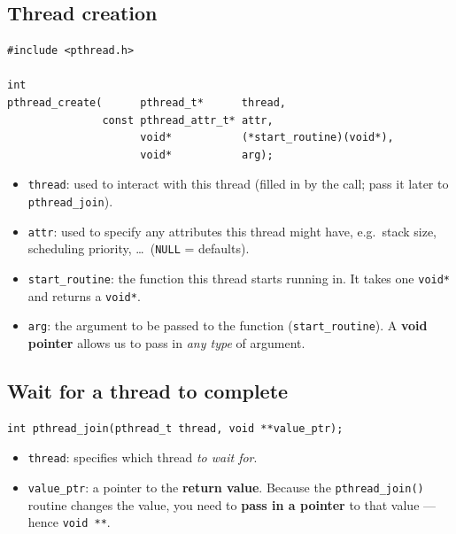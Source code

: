 \documentclass[11pt,a4paper]{article}
\begin{document}
\subsection{Thread creation}

\begin{lstlisting}[numbers=none]
#include <pthread.h>

int
pthread_create(      pthread_t*      thread,
               const pthread_attr_t* attr,
                     void*           (*start_routine)(void*),
                     void*           arg);
\end{lstlisting}

\begin{itemize}
  \item \texttt{thread}: used to interact with this thread (filled in by
        the call; pass it later to \texttt{pthread\_join}).
  \item \texttt{attr}: used to specify any attributes this thread might
        have, e.g.\ stack size, scheduling priority, \ldots\ (\texttt{NULL}
        = defaults).
  \item \texttt{start\_routine}: the function this thread starts running
        in. It takes one \texttt{void*} and returns a \texttt{void*}.
  \item \texttt{arg}: the argument to be passed to the function
        (\texttt{start\_routine}). A \textbf{void pointer} allows us to pass
        in \emph{any type} of argument.
\end{itemize}

\subsection{Wait for a thread to complete}

\begin{lstlisting}[numbers=none]
int pthread_join(pthread_t thread, void **value_ptr);
\end{lstlisting}

\begin{itemize}
  \item \texttt{thread}: specifies which thread \emph{to wait for}.
  \item \texttt{value\_ptr}: a pointer to the \textbf{return value}.
        Because the \texttt{pthread\_join()} routine changes the value, you
        need to \textbf{pass in a pointer} to that value --- hence
        \texttt{void **}.
\end{itemize}
\end{document}
